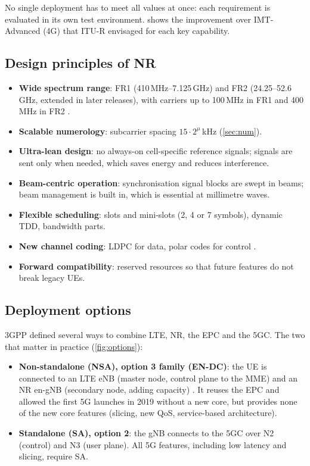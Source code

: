 \documentclass[11pt,a4paper]{article}
\begin{document}
No single deployment has to meet all values at once: each requirement is evaluated in its own test
environment.  shows the improvement over IMT-Advanced (4G) that ITU-R envisaged for
each key capability.

\begin{acnfigure}
  \caption{Improvement factors of IMT-2020 key capabilities over IMT-Advanced, as envisaged in ITU-R M.2083
           \cite{itu2015m2083}. Latency is shown as its inverse.}
  \label{fig:capabilities}
\end{acnfigure}

\subsection{Design principles of NR}
\begin{itemize}
  \item \textbf{Wide spectrum range}: FR1 (410\,MHz--7.125\,GHz) and FR2 (24.25--52.6\,GHz, extended in later
        releases), with carriers up to 100\,MHz in FR1 and 400\,MHz in FR2 \cite{ts38300}.
  \item \textbf{Scalable numerology}: subcarrier spacing $15\cdot2^\mu$\,kHz (\cref{sec:num}).
  \item \textbf{Ultra-lean design}: no always-on cell-specific reference signals; signals are sent only when
        needed, which saves energy and reduces interference.
  \item \textbf{Beam-centric operation}: synchronisation signal blocks are swept in beams; beam management is
        built in, which is essential at millimetre waves.
  \item \textbf{Flexible scheduling}: slots and mini-slots (2, 4 or 7 symbols), dynamic TDD, bandwidth parts.
  \item \textbf{New channel coding}: LDPC for data, polar codes for control \cite{ts38211}.
  \item \textbf{Forward compatibility}: reserved resources so that future features do not break legacy UEs.
\end{itemize}

\subsection{Deployment options}
3GPP defined several ways to combine LTE, NR, the EPC and the 5GC. The two that matter in practice
(\cref{fig:options}):
\begin{itemize}
  \item \textbf{Non-standalone (NSA), option 3 family (EN-DC)}: the UE is connected to an LTE eNB (master node,
        control plane to the MME) and an NR en-gNB (secondary node, adding capacity) \cite{ts37340}. It reuses the
        EPC and allowed the first 5G launches in 2019 without a new core, but provides none of the new core
        features (slicing, new QoS, service-based architecture).
  \item \textbf{Standalone (SA), option 2}: the gNB connects to the 5GC over N2 (control) and N3 (user plane).
        All 5G features, including low latency and slicing, require SA.
\end{itemize}
\end{document}
